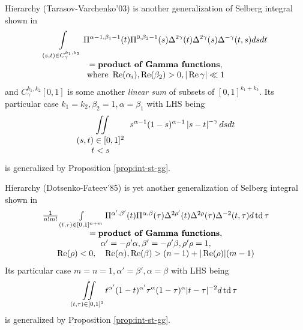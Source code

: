 \documentclass[pdf,notes]{beamer}
\newcommand{\mypgf}{{\mbox{\bf product of Gamma functions}}}
\newcommand{\tmop}[1]{\ensuremath{\operatorname{#1}}}
\begin{document}
\begin{frame}{Hierarchy (Tarasov-Varchenko'03)}
	\scriptsize
	 is another generalization of Selberg integral shown in \cite[(3.4)]{tarasov2003selberg}\begin{equation*}
\begin{array}{c}
  \displaystyle\int_{(s, t) \in C_{\gamma}^{k_1, k_2}} \Pi^{\alpha - 1, \beta_1 - 1} (t)
  \Pi^{0, \beta_2 - 1} (s) \Delta^{2 \gamma} (t) \Delta^{2 \gamma} (s)
  \Delta^{- \gamma} (t, s) d s d t \\
  =\mypgf,\\
  \mbox{where }\tmop{Re} (\alpha_i), \tmop{Re} (\beta_2) > 0, | \tmop{Re} \gamma | \ll 1
\end{array}
			\end{equation*}
			and $C^{k_1,k_2}_\gamma[0,1]$ is some another {\it linear sum} of subsets of $[0,1]^{k_1+k_2}$.
			Its particular case $k_1=k_2,\beta_2=1,\alpha=\beta_1$ with LHS being\begin{equation*}
				\displaystyle\iint\displaylimits_{\begin{array}[]{c}
				(s, t) \in [0, 1]^2\\t<s
			\end{array}} s^{\alpha - 1} (1 - s)^{\alpha - 1} \myabs{s-t}^{- \gamma} d s d t
			\end{equation*}
			is generalized by Proposition \ref{prop:int-st-gg}.
\end{frame}
\begin{frame}{Hierarchy (Dotsenko-Fateev'85)}
	\scriptsize
	 is yet another generalization of Selberg integral shown in \cite[(A35)]{dotsenko1985four}\begin{equation*}
\begin{array}{c}
  \frac{1}{n!m!} \int_{(t, \tau) \in [0, 1]^{n + m}} \Pi^{\alpha', \beta'} (t)
  \Pi^{\alpha, \beta} (\tau) \Delta^{2 \rho'} (t) \Delta^{2 \rho} (\tau)
  \Delta^{- 2} (t, \tau) d \tmop{td} \tau \\
  =\mypgf,\\
  \alpha' = - \rho' \alpha, \beta' = - \rho' \beta, \rho' \rho = 1,\\
  \tmop{Re} (\rho) < 0, \quad \tmop{Re} (\alpha), \tmop{Re} (\beta) > (n - 1)
  + | \tmop{Re} (\rho) | (m - 1)
\end{array}
			\end{equation*}
			Its particular case $m=n=1,\alpha'=\beta',\alpha=\beta$ with LHS being\begin{equation*}
				\displaystyle\iint\displaylimits_{(t, \tau) \in [0, 1]^2} t^{\alpha'} (1 - t)^{\alpha'} \tau^{\alpha} (1
				- \tau)^{\alpha} | t - \tau |^{- 2} d \tmop{td} \tau
			\end{equation*}
			is generalized by Proposition \ref{prop:int-st-gg}.
\end{frame}
\end{document}
